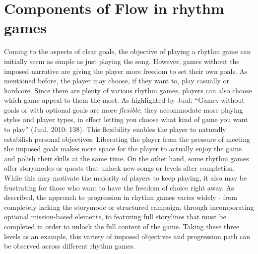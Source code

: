 \section{Components of Flow in rhythm games}
Coming to the aspects of clear goals, the objective of playing a rhythm game can initially seem as simple as just playing the song. However, games without the imposed narrative are giving the player more freedom to set their own goals. As mentioned before, the player may choose, if they want to, play casually or hardcore. Since there are plenty of various rhythm games, players can also choose which game appeal to them the most. As highlighted by Juul: “Games without goals or with optional goals are more \textit{flexible}: they accommodate more playing styles and player types, in effect letting you choose what kind of game you want to play” (Juul, 2010: 138). This flexibility enables the player to naturally estabilish personal objectives. Liberating the player from the pressure of meeting the imposed goals makes more space for the player to actually enjoy the game and polish their skills at the same time. On the other hand, some rhythm games offer storymodes or quests that unlock new songs or levels after completion. While this may motivate the majority of players to keep playing, it also may be frustrating for those who want to have the freedom of choice right away.
As described, the approach to progression in rhythm games varies widely - from completely lacking the storymode or structured campaign, through incomporating optional mission-based elements, to featuring full storylines that must be completed in order to unlock the full content of the game. Taking these three levels as an example, this variety of imposed objectives and progression path can be observed across different rhythm games.
